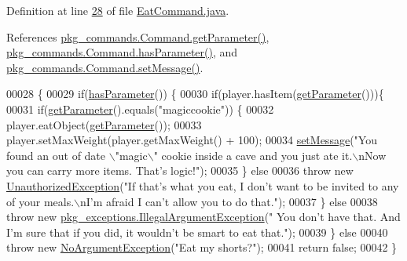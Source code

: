 Definition at line \hyperlink{EatCommand_8java_source_l00028}{28} of file \hyperlink{EatCommand_8java_source}{Eat\-Command.\-java}.



References \hyperlink{Command_8java_source_l00034}{pkg\-\_\-commands.\-Command.\-get\-Parameter()}, \hyperlink{Command_8java_source_l00050}{pkg\-\_\-commands.\-Command.\-has\-Parameter()}, and \hyperlink{Command_8java_source_l00058}{pkg\-\_\-commands.\-Command.\-set\-Message()}.


\begin{DoxyCode}
00028                                                                                                            
                              \{
00029         \textcolor{keywordflow}{if}(\hyperlink{classpkg__commands_1_1Command_a02af95ab3f1898a66259ab7c177b6998}{hasParameter}()) \{
00030             \textcolor{keywordflow}{if}(player.hasItem(\hyperlink{classpkg__commands_1_1Command_a41c92d445be73ea9d62320c65efb8434}{getParameter}()))\{
00031                 \textcolor{keywordflow}{if}(\hyperlink{classpkg__commands_1_1Command_a41c92d445be73ea9d62320c65efb8434}{getParameter}().equals(\textcolor{stringliteral}{"magiccookie"})) \{
00032                     player.eatObject(\hyperlink{classpkg__commands_1_1Command_a41c92d445be73ea9d62320c65efb8434}{getParameter}());
00033                     player.setMaxWeight(player.getMaxWeight() + 100);
00034                     \hyperlink{classpkg__commands_1_1Command_ae210ff216fe908b111ba1c988a963d13}{setMessage}(\textcolor{stringliteral}{"You found an out of date \(\backslash\)"magic\(\backslash\)" cookie inside a cave and you
       just ate it.\(\backslash\)nNow you can carry more items. That's logic!"});
00035                 \} \textcolor{keywordflow}{else}
00036                     \textcolor{keywordflow}{throw} \textcolor{keyword}{new} \hyperlink{classpkg__exceptions_1_1UnauthorizedException}{UnauthorizedException}(\textcolor{stringliteral}{"If that's what you eat, I don't
       want to be invited to any of your meals.\(\backslash\)nI'm afraid I can't allow you to do that."});
00037             \} \textcolor{keywordflow}{else} 
00038                 \textcolor{keywordflow}{throw} \textcolor{keyword}{new} \hyperlink{classpkg__exceptions_1_1IllegalArgumentException}{pkg\_exceptions.IllegalArgumentException}(\textcolor{stringliteral}{"
      You don't have that. And I'm sure that if you did, it wouldn't be smart to eat that."});
00039         \} \textcolor{keywordflow}{else} 
00040             \textcolor{keywordflow}{throw} \textcolor{keyword}{new} \hyperlink{classpkg__exceptions_1_1NoArgumentException}{NoArgumentException}(\textcolor{stringliteral}{"Eat my shorts?"});
00041         \textcolor{keywordflow}{return} \textcolor{keyword}{false};
00042     \}
\end{DoxyCode}


